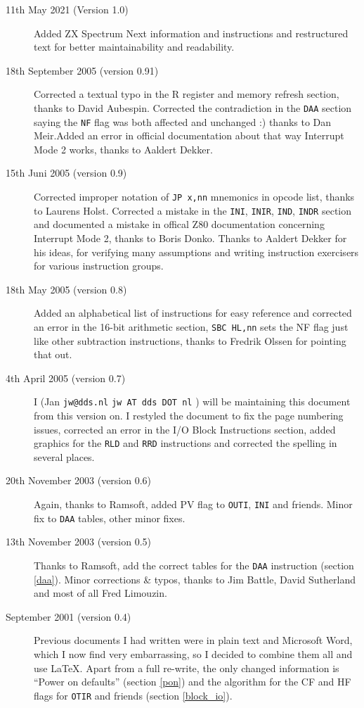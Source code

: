 \documentclass[12pt,twoside,openright,a4paper]{book}
\makeatletter
\newcommand*{\PRINTED}{}	%
\newcommand{\email}[3]{
	\ifdefined\PRINTED
		{\tt #1@#2.#3}
	\else
		{\tt #1 AT #2 DOT #3}
	\fi
}
\makeatother
\begin{document}
\begin{description}

	\item[11th May 2021 (Version 1.0)]
	Added ZX Spectrum Next information and instructions and restructured text for better maintainability and readability.

	\item[18th September 2005 (version 0.91)]
	Corrected a textual typo in the R register and memory refresh section, thanks to David Aubespin. Corrected the contradiction in the {\tt DAA} section saying the {\tt NF} flag was both affected and unchanged :) thanks to Dan Meir.Added an error in official documentation about that way Interrupt Mode 2 works, thanks to Aaldert Dekker.
	
	\item[15th Juni 2005 (version 0.9)]
	Corrected improper notation of {\tt JP x,nn} mnemonics in opcode list, thanks to Laurens Holst. Corrected a mistake in the {\tt INI}, {\tt INIR}, {\tt IND}, {\tt INDR} section and documented a mistake in offical Z80 documentation concerning Interrupt Mode 2, thanks to Boris Donko. Thanks to Aaldert Dekker for his ideas, for verifying many assumptions and writing instruction exercisers for various instruction groups.

	\item[18th May 2005 (version 0.8)]
	Added an alphabetical list of instructions for easy reference and corrected an error in the 16-bit arithmetic section, {\tt SBC HL,nn} sets the NF flag just like other subtraction instructions, thanks to Fredrik Olssen for pointing that out.

	\item[4th April 2005 (version 0.7)]
	I (Jan \email{jw}{dds}{nl}) will be maintaining this document from this version on. I restyled the document to fix the page numbering issues, corrected an error in the I/O Block Instructions section, added graphics for the {\tt RLD} and {\tt RRD} instructions and corrected the spelling in several places.

	\item[20th November 2003 (version 0.6)]
	Again, thanks to Ramsoft, added PV flag to {\tt OUTI}, {\tt INI} and friends. Minor fix to {\tt DAA} tables, other minor fixes.

	\item[13th November 2003 (version 0.5)]
	Thanks to Ramsoft, add the correct tables for the {\tt DAA} instruction (section \ref{daa}). Minor corrections \& typos, thanks to Jim Battle, David Sutherland and most of all Fred Limouzin.

	\item[September 2001 (version 0.4)]
	Previous documents I had written were in plain text and Microsoft Word, which I now find very embarrassing, so I decided to combine them all and use {\LaTeX}. Apart from a full re-write, the only changed information is ``Power on defaults'' (section \ref{pon}) and the algorithm for the CF and HF flags for {\tt OTIR} and friends (section \ref{block_io}).

\end{description}
\end{document}
